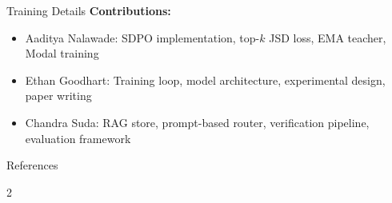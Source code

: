 \documentclass[final]{beamer}
\newlength{\sepwidth}
\newlength{\colwidth}
\begin{document}
\begin{frame}[t]
\begin{columns}[t]
\begin{column}{\colwidth}
\begin{block}{Training Details}
\textbf{Contributions:}
\begin{itemize}[]
  \item Aaditya Nalawade: SDPO implementation, top-$k$ JSD loss, EMA teacher, Modal training
  \item Ethan Goodhart: Training loop, model architecture, experimental design, paper writing
  \item Chandra Suda: RAG store, prompt-based router, verification pipeline, evaluation framework
\end{itemize}

\end{block}

\begin{block}{References}

\scriptsize
\vspace{-1ex}
\begin{multicols}{2}
\nocite{*}


\end{multicols}

\end{block}

\end{column}

\begin{column}{\sepwidth}\end{column}
\end{columns}
\end{frame}
\end{document}
